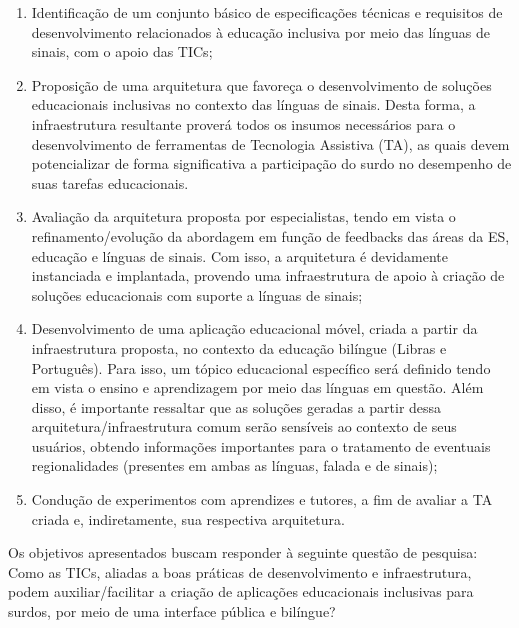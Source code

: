 \begin{enumerate}
\item Identificação de um conjunto básico de especificações técnicas e requisitos de desenvolvimento relacionados à educação inclusiva por meio das línguas de sinais, com o apoio das TICs; %
\item Proposição de uma arquitetura que favoreça o desenvolvimento de soluções educacionais inclusivas no contexto das línguas de sinais. Desta forma, a infraestrutura resultante proverá todos os insumos necessários para o desenvolvimento de ferramentas de Tecnologia Assistiva (TA), as quais devem potencializar de forma significativa a participação do surdo no desempenho de suas tarefas educacionais.
\item Avaliação da arquitetura proposta por especialistas, tendo em vista o refinamento/evolução da abordagem em função de feedbacks das áreas da ES, educação e línguas de sinais. Com isso, a arquitetura é devidamente instanciada e implantada, provendo uma infraestrutura de apoio à criação de soluções educacionais com suporte a línguas de sinais;
\item Desenvolvimento de uma aplicação educacional móvel, criada a partir da infraestrutura proposta, no contexto da educação bilíngue (Libras e Português). Para isso, um tópico educacional específico será definido tendo em vista o ensino e aprendizagem por meio das línguas em questão. %
Além disso, é importante ressaltar que as soluções geradas a partir dessa arquitetura/infraestrutura comum serão sensíveis ao contexto de seus usuários, obtendo informações importantes para o tratamento de eventuais regionalidades (presentes em ambas as línguas, falada e de sinais);
\item Condução de experimentos com aprendizes e tutores, %
a fim de avaliar a TA criada e, indiretamente, sua respectiva arquitetura.
\end{enumerate}

Os objetivos apresentados buscam responder à seguinte questão de pesquisa: Como as TICs, aliadas a boas práticas de desenvolvimento e infraestrutura, podem auxiliar/facilitar a criação de aplicações educacionais inclusivas para surdos, por meio de uma interface pública e bilíngue?

